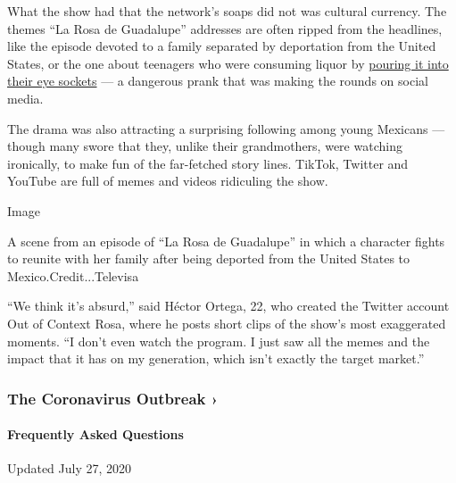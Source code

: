 What the show had that the network's soaps did not was cultural
currency. The themes ``La Rosa de Guadalupe'' addresses are often ripped
from the headlines, like the episode devoted to a family separated by
deportation from the United States, or the one about teenagers who were
consuming liquor by
\href{https://www.ncbi.nlm.nih.gov/pmc/articles/PMC4009175/}{pouring it
into their eye sockets} --- a dangerous prank that was making the rounds
on social media.

The drama was also attracting a surprising following among young
Mexicans --- though many swore that they, unlike their grandmothers,
were watching ironically, to make fun of the far-fetched story lines.
TikTok, Twitter and YouTube are full of memes and videos ridiculing the
show.

Image

A scene from an episode of ``La Rosa de Guadalupe'' in which a character
fights to reunite with her family after being deported from the United
States to Mexico.Credit...Televisa

``We think it's absurd,'' said Héctor Ortega, 22, who created the
Twitter account Out of Context Rosa, where he posts short clips of the
show's most exaggerated moments. ``I don't even watch the program. I
just saw all the memes and the impact that it has on my generation,
which isn't exactly the target market.''

\href{https://www.nytimes3xbfgragh.onion/news-event/coronavirus?action=click\&pgtype=Article\&state=default\&region=MAIN_CONTENT_3\&context=storylines_faq}{}

\hypertarget{the-coronavirus-outbreak-}{%
\subsubsection{The Coronavirus Outbreak
›}\label{the-coronavirus-outbreak-}}

\hypertarget{frequently-asked-questions}{%
\paragraph{Frequently Asked
Questions}\label{frequently-asked-questions}}

Updated July 27, 2020

